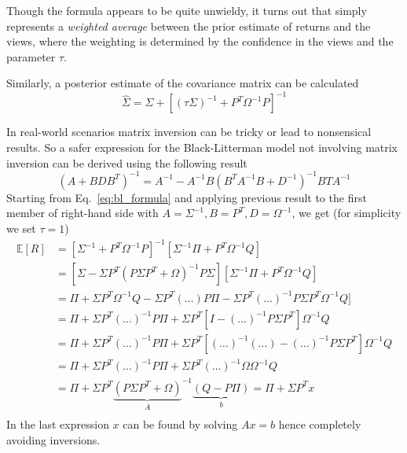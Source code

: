 Though the formula appears to be quite unwieldy, it turns out that simply represents a \emph{weighted average} between the prior estimate of returns and the views, where the weighting is determined by the confidence in the views and the parameter $\tau$.

Similarly, a posterior estimate of the covariance matrix can be calculated
\begin{equation}
	\hat{\Sigma} = \Sigma +[(\tau \Sigma)^{-1} + P^T \Omega^{-1}P]^{-1}
\end{equation}

\begin{attention}
	In real-world scenarios matrix inversion can be tricky or lead to nonsensical results. So a safer expression for the Black-Litterman model not involving matrix inversion can be derived using the following result
	\begin{equation*}
		(A+BDB^T)^{-1} = A^{-1} - A^{-1}B(B^TA^{-1}B+D^{-1})^{-1}BTA^{-1}
	\end{equation*}
	Starting from Eq.~\ref{eq:bl_formula} and applying previous result to the first member of right-hand side with $A=\Sigma^{-1}, B=P^T, D=\Omega^{-1}$,
	we get (for simplicity we set $\tau=1$)
	\begin{equation}
		\begin{aligned}
			\mathbb{E}[R] &= [\Sigma^{-1}+P^T\Omega^{-1}P]^{-1}[\Sigma^{-1}\Pi + P^T\Omega^{-1}Q] \\
			&= [\Sigma - \Sigma P^T(P\Sigma P^T + \Omega)^{-1} P\Sigma][\Sigma^{-1}\Pi + P^T\Omega^{-1}Q] \\
			&= \Pi + \Sigma P^T\Omega^{-1}Q - \Sigma P^T(\ldots)P\Pi - \Sigma P^T(\ldots)^{-1} P\Sigma P^T\Omega^{-1}Q] \\
			&= \Pi + \Sigma P^T(\ldots)^{-1} P\Pi + \Sigma P^T[I - (\ldots)^{-1}P\Sigma P^T]\Omega^{-1}Q \\
			&= \Pi + \Sigma P^T(\ldots)^{-1} P\Pi + \Sigma P^T[(\ldots)^{-1} (\ldots) - (\ldots)^{-1}P\Sigma P^T]\Omega^{-1}Q \\
			&= \Pi + \Sigma P^T(\ldots)^{-1} P\Pi + \Sigma P^T(\ldots)^{-1} \Omega\Omega^{-1}Q \\
			&= \Pi + \Sigma P^T{\underbrace{(P\Sigma P^T + \Omega)}_{A}}^{-1} \underbrace{(Q- P\Pi)}_{b} = \Pi + \Sigma P^T x \\
		\end{aligned}
	\end{equation}
	In the last expression $x$ can be found by solving $Ax=b$ hence completely avoiding inversions.
\end{attention}

